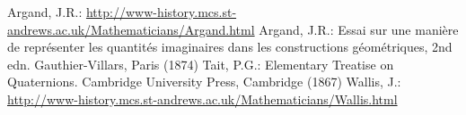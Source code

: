 \begin{thebibliography}{99}
     Argand, J.R.: \href{http://www-history.mcs.st-andrews.ac.uk/Mathematicians/Argand.html}{http://www-history.mcs.st-andrews.ac.uk/Mathematicians/Argand.html}
     Argand, J.R.: Essai sur une manière de représenter les quantités imaginaires dans les constructions géométriques, 2nd edn. Gauthier-Villars, Paris (1874)
     Tait, P.G.: Elementary Treatise on Quaternions. Cambridge University Press, Cambridge (1867)
     Wallis, J.: \href{http://www-history.mcs.st-andrews.ac.uk/Mathematicians/Wallis.html}{http://www-history.mcs.st-andrews.ac.uk/Mathematicians/Wallis.html}
\end{thebibliography}
